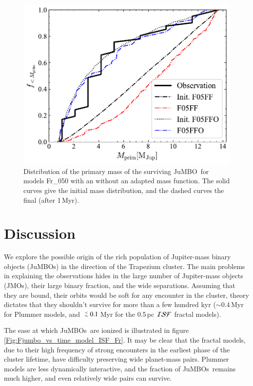 \documentclass[submission,phys]{lib/SciPost}
\def\aplt{\ {\raise-.5ex\hbox{$\buildrel<\over\sim$}}\ }
\newcommand{\jumbo}{\mbox{JuMBO}}
\newcommand{\jumbos}{\mbox{JuMBOs}}
\begin{document}
\begin{figure}
    \centering
    \includegraphics[width=0.75\columnwidth]{figures/Frac_FF_GenObs_mprim.pdf}
    \caption{Distribution of the primary mass of the surviving
      \jumbo\, for models Fr\_050 with an without an adapted mass
      function. The solid curves give the initial mass distribution,
      and the dashed curves the final (after 1\,Myr).}
         \label{Fig:Mdistr_F05}
\end{figure}

\section{Discussion}\label{Sect:Discussion}

We explore the possible origin of the rich population of Jupiter-mass
binary objects (\jumbos) in the direction of the Trapezium cluster.
The main problems in explaining the observations hides in the large
number of Jupiter-mass objects (JMOs), their large binary fraction, and the
wide separations. Assuming that they are bound, their orbits would be
soft for any encounter in the cluster, theory dictates that they shouldn't
survive for more than a few hundred kyr ($\sim 0.4$\,Myr for Plummer
models, and $\aplt 0.1$\,Myr for the 0.5\,pc ${\cal ISF}$ fractal
models).

The ease at which \jumbos\, are ionized is illustrated in
figure\,\ref{Fig:Fjumbo_vs_time_model_ISF_Fr}. It may be clear that
the fractal models, due to their high frequency of strong encounters
in the earliest phase of the cluster lifetime, have difficulty preserving wide
planet-mass pairs. Plummer models are less dynamically interactive,
and the fraction of \jumbos\, remains much higher, and even relatively
wide pairs can survive.
\end{document}

